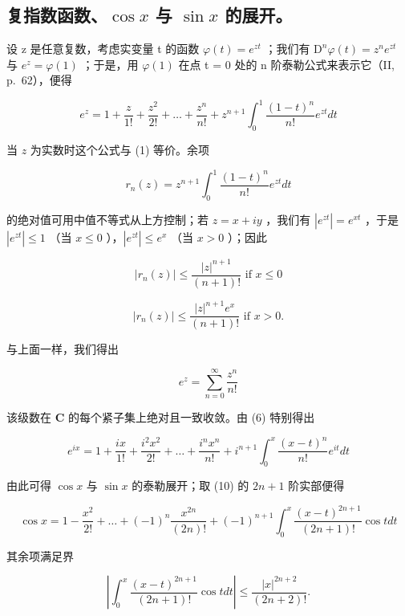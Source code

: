 \subsection{\texorpdfstring{复指数函数、\(\cos x\) 与 \(\sin x\) 的展开。}{复指数函数、cos x 与 sin x 的展开。}}

设 z 是任意复数，考虑实变量 t 的函数 \(\varphi(t) = e^{zt}\) ；我们有 \(\mathrm{D}^{n}\varphi(t) = z^{n}e^{zt}\) 与 \(e^{z} = \varphi(1)\) ；于是，用 \(\varphi(1)\) 在点 t = 0 处的 n 阶泰勒公式来表示它（II, p.~62），便得

\[
e ^ {z} = 1 + \frac {z}{1 !} + \frac {z ^ {2}}{2 !} + \dots + \frac {z ^ {n}}{n !} + z ^ {n + 1} \int_ {0} ^ {1} \frac {(1 - t) ^ {n}}{n !} e ^ {z t} d t\tag{6}
\]

当 \(z\) 为实数时这个公式与 (1) 等价。余项

\[
r _ {n} (z) = z ^ {n + 1} \int_ {0} ^ {1} \frac {(1 - t) ^ {n}}{n !} e ^ {z t} d t
\]

的绝对值可用中值不等式从上方控制；若 \(z = x + iy\) ，我们有 \(|e^{zt}| = e^{xt}\) ，于是 \(|e^{zt}| \leqslant 1\) （当 \(x \leqslant 0\) ），\(|e^{zt}| \leqslant e^x\) （当 \(x > 0\) ）；因此

\[
\left| r _ {n} (z) \right| \leqslant \frac {\left| z \right| ^ {n + 1}}{(n + 1) !} \text {   if   } x \leqslant 0\tag{7}
\]

\[
| r _ {n} (z) | \leqslant \frac {| z | ^ {n + 1} e ^ {x}}{(n + 1) !} \text {   if   } x > 0.\tag{8}
\]

与上面一样，我们得出

\[
e ^ {z} = \sum_ {n = 0} ^ {\infty} \frac {z ^ {n}}{n !}\tag{9}
\]

该级数在 \(\mathbf{C}\) 的每个紧子集上绝对且一致收敛。由 (6) 特别得出

\[
e ^ {i x} = 1 + \frac {i x}{1 !} + \frac {i ^ {2} x ^ {2}}{2 !} + \dots + \frac {i ^ {n} x ^ {n}}{n !} + i ^ {n + 1} \int_ {0} ^ {x} \frac {(x - t) ^ {n}}{n !} e ^ {i t} d t\tag{10}
\]

由此可得 \(\cos x\) 与 \(\sin x\) 的泰勒展开；取 (10) 的 \(2n + 1\) 阶实部便得

\[
\cos x = 1 - \frac {x ^ {2}}{2 !} + \dots + (- 1) ^ {n} \frac {x ^ {2 n}}{(2 n) !} + (- 1) ^ {n + 1} \int_ {0} ^ {x} \frac {(x - t) ^ {2 n + 1}}{(2 n + 1) !} \cos t d t\tag{11}
\]

其余项满足界

\[
\left| \int_ {0} ^ {x} \frac {(x - t) ^ {2 n + 1}}{(2 n + 1) !} \cos t d t \right| \leqslant \frac {| x | ^ {2 n + 2}}{(2 n + 2) !}.\tag{12}
\]

